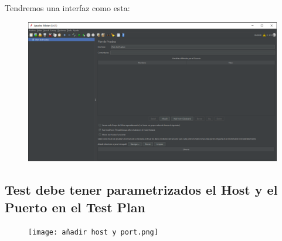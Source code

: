 \documentclass[a4paper]{article}
\begin{document}
\newline Tendremos una interfaz como esta:
\begin{figure}[hbt!]
    \centering
    \includegraphics[width=\textwidth]{interfaz apache jmeter.png}
\end{figure}
\newpage
\subsection{Test debe tener parametrizados el Host y el Puerto en el Test Plan}
\begin{figure}[hbt!]
    \centering
    \texttt{[image: añadir host y port.png]}
\end{figure}
\end{document}
